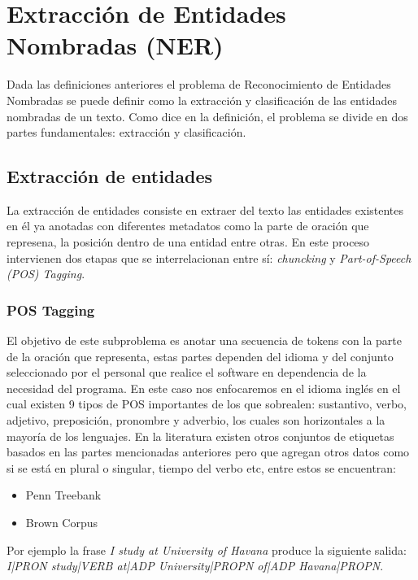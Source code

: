 \documentclass[runningheads]{llncs}
\begin{document}
\section{Extracción de Entidades Nombradas (NER)}

Dada las definiciones anteriores el problema de Reconocimiento de Entidades Nombradas se puede definir como la extracción y clasificación de las entidades nombradas de un texto. Como dice en la definición, el problema se divide en dos partes fundamentales: extracción y clasificación.

\subsection{Extracción de entidades}

La extracción de entidades consiste en extraer del texto las entidades existentes en él ya anotadas con diferentes metadatos como la parte de oración que represena, la posición dentro de una entidad entre otras. En este proceso intervienen dos etapas que se interrelacionan entre sí: \emph{chuncking}\cite{chunking} y \emph{Part-of-Speech (POS) Tagging}\cite{postag}.

\subsubsection{POS Tagging}

El objetivo de este subproblema es anotar una secuencia de tokens con la parte de la oración que representa, estas partes dependen del idioma y del conjunto seleccionado por el personal que realice el software en dependencia de la necesidad del programa. En este caso nos enfocaremos en el idioma inglés en el cual existen 9 tipos de POS importantes de los que sobrealen: sustantivo, verbo, adjetivo, preposición, pronombre y adverbio, los cuales son horizontales a la mayoría de los lenguajes. En la literatura existen otros conjuntos de etiquetas basados en las partes mencionadas anteriores pero que agregan otros datos como si se está en plural o singular, tiempo del verbo etc, entre estos se encuentran:

\begin{itemize}
\item Penn Treebank \cite{pennpostag}
\item Brown Corpus \cite{brownpostag}
\end{itemize}

Por ejemplo la frase \emph{I study at University of Havana} produce la siguiente salida: \emph{I|PRON study|VERB at|ADP University|PROPN of|ADP Havana|PROPN}.
\end{document}
